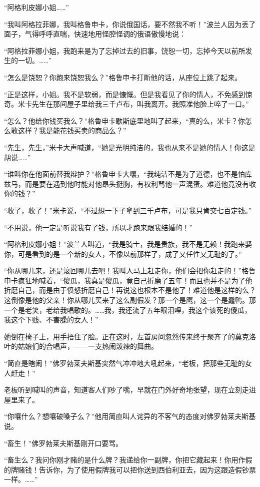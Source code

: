 \par “阿格利皮娜小姐……”
\par “我叫阿格拉菲娜，我叫格鲁申卡，你说俄国话，要不然我不听！”波兰人因为丢了面子，气得呼呼直喘，快速地用怪腔怪调的俄语傲慢地说：
\par “阿格拉菲娜小姐，我跑来是为了忘掉过去的旧事，饶恕一切，忘掉今天以前所发生的一切。……”
\par “怎么是饶恕？你跑来饶恕我么？”格鲁申卡打断他的话，从座位上跳了起来。
\par “正是这样，小姐。我不是软弱，而是慷慨。但是我看见了你的情人，不免感到惊奇。米卡先生在那间屋子里给我三千卢布，叫我离开。我照准他脸上啐了一口。”
\par “怎么？他给你钱买我么？”格鲁申卡歇斯底里地叫了起来，“真的么，米卡？你怎么敢这样？我是能花钱买卖的商品么？”
\par “先生，先生，”米卡大声喊道，“她是光明纯洁的，我也从来不是她的情人！你这是胡说……”
\par “谁叫你在他面前替我辩护？”格鲁申卡大嚷，“我纯洁不是为了道德，也不是怕库兹马，而是要在遇到他时能对他昂头挺胸，有权利骂他一声混蛋。难道他竟没有收你的钱？”
\par “收了，收了！”米卡说，“不过想一下子拿到三千卢布，可是我只肯交七百定钱。”
\par “不用说，他一定是听说我有了钱，所以才跑来跟我结婚的！”
\par “阿格利皮娜小姐！”波兰人叫道，“我是骑士，我是贵族，我不是无赖！我跑来娶你，可是看到的是一个新的女人，不像以前那样了，成了又任性又无耻的了。”
\par “你从哪儿来，还是滚回哪儿去吧！我叫人马上赶走你，他们会把你赶走的！”格鲁申卡疯狂地喊着，“傻瓜，我真是傻瓜，竟自己折磨了五年！而且也并不是为了他折磨自己，而是由于愤怒折磨自己！再说这也根本不是他了！难道他是这样的么？这倒像是他的父亲！你从哪儿买来了这么副假发？那一个是鹰，这一个是蠢鸭。那一个是老笑，老给我唱歌的。……我，我还流了五年眼泪哩，我这个该死的傻瓜，我这个下贱、不害臊的女人！”
\par 她倒在椅子上，用手捂住了脸。正在这时，左首房间忽然传来终于聚齐了的莫克洛叶的姑娘们的合唱声，——一支热闹泼辣的舞曲。
\par “简直是瞎闹！”佛罗勃莱夫斯基突然气冲冲地大吼起来，“老板，把那些无耻的女人赶走！”
\par 老板听到喊叫的声音，知道客人们吵了嘴，早就在门外好奇地张望，现在立刻走进屋里来了。
\par “你嚷什么？想嚷破嗓子么？”他用简直叫人诧异的不客气的态度对佛罗勃莱夫斯基说。
\par “畜生！”佛罗勃莱夫斯基刚开口要骂。
\par “畜生么？我问你刚才赌的是什么牌？我递给你一副牌，你把它藏起来！你用作假的牌赌钱！告诉你，为了使用假牌我可以把你送到西伯利亚去，因为这跟造假钞票一样。……”

